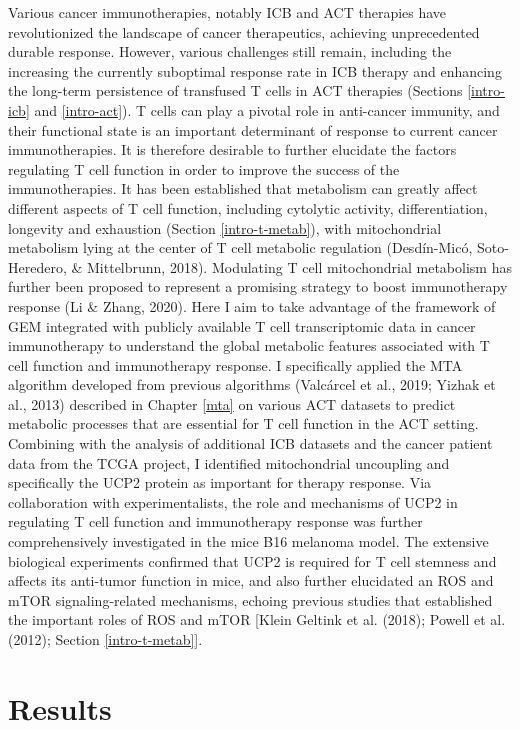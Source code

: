 \documentclass[12pt,twoside,openany,\mydriver]{thesis}  %
\begin{document}
Various cancer immunotherapies, notably ICB and ACT therapies have revolutionized the landscape of cancer therapeutics, achieving unprecedented durable response. However, various challenges still remain, including the increasing the currently suboptimal response rate in ICB therapy and enhancing the long-term persistence of transfused T cells in ACT therapies (Sections \ref{intro-icb} and \ref{intro-act}). T cells can play a pivotal role in anti-cancer immunity, and their functional state is an important determinant of response to current cancer immunotherapies. It is therefore desirable to further elucidate the factors regulating T cell function in order to improve the success of the immunotherapies. It has been established that metabolism can greatly affect different aspects of T cell function, including cytolytic activity, differentiation, longevity and exhaustion (Section \ref{intro-t-metab}), with mitochondrial metabolism lying at the center of T cell metabolic regulation (Desdín-Micó, Soto-Heredero, \& Mittelbrunn, 2018). Modulating T cell mitochondrial metabolism has further been proposed to represent a promising strategy to boost immunotherapy response (Li \& Zhang, 2020). Here I aim to take advantage of the framework of GEM integrated with publicly available T cell transcriptomic data in cancer immunotherapy to understand the global metabolic features associated with T cell function and immunotherapy response. I specifically applied the MTA algorithm developed from previous algorithms (Valcárcel et al., 2019; Yizhak et al., 2013) described in Chapter \ref{mta} on various ACT datasets to predict metabolic processes that are essential for T cell function in the ACT setting. Combining with the analysis of additional ICB datasets and the cancer patient data from the TCGA project, I identified mitochondrial uncoupling and specifically the UCP2 protein as important for therapy response. Via collaboration with experimentalists, the role and mechanisms of UCP2 in regulating T cell function and immunotherapy response was further comprehensively investigated in the mice B16 melanoma model. The extensive biological experiments confirmed that UCP2 is required for T cell stemness and affects its anti-tumor function in mice, and also further elucidated an ROS and mTOR signaling-related mechanisms, echoing previous studies that established the important roles of ROS and mTOR {[}Klein Geltink et al. (2018); Powell et al. (2012); Section \ref{intro-t-metab}{]}.

\hypertarget{results-1}{%
\section{Results}\label{results-1}}
\end{document}
